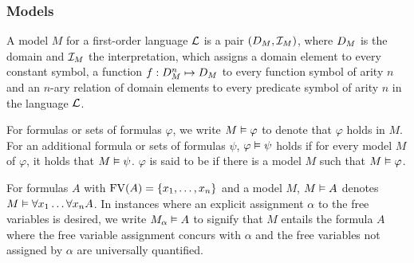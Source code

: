 \subsubsection*{Models}
A model $M$ for a first-order language $\operatorname{\mathcal{L}}$ is a pair $(D_{M}, \mathcal{I}_{M})$, where $D_{M}$ is the domain and $\mathcal{I}_{M}$ the interpretation, which assigns a domain element to every constant symbol, a function $f : D_{M}^n \mapsto D_{M}$ to every function symbol of arity $n$ and an $n$-ary relation of domain elements to every predicate symbol of arity $n$ in the language $\operatorname{\mathcal{L}}$.

For formulas or sets of formulas $\varphi$, we write $M \vDash \varphi$ to denote that $\varphi$ holds in $M$.
For an additional formula or sets of formulas $\psi$, $\varphi \vDash \psi$ holds if for every model $M$ of $\varphi$, it holds that $M \vDash \psi$.
 $\varphi$ is said to be  if there is a model $M$ such that $M \vDash \varphi$.


For formulas $A$ with $\operatorname{FV}(A) = \{x_1, \dots, x_n\}$ and a model $M$, $M\vDash A$ denotes $M \vDash \forall x_1 \dots \forall x_n A$.
In instances where an explicit assignment $\alpha$ to the free variables is desired,
we write $M_\alpha \vDash A$ 
to signify that $M$ entails the formula $A$ where the free variable assignment concurs with $\alpha$ and the free variables not assigned by $\alpha$ are universally quantified.


